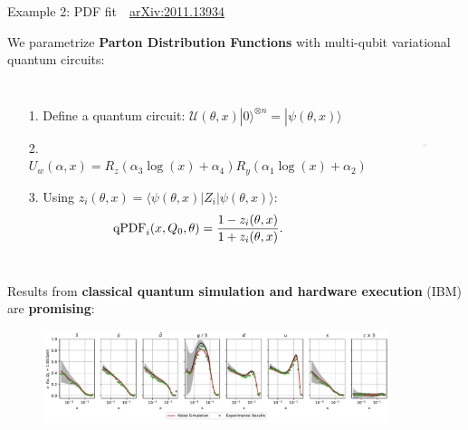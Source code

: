\documentclass[aspectratio=169, 8pt, xcolor={svgnames}, hyperref={linkcolor=black}]{beamer}
\begin{document}
\begin{frame}[fragile]{Example 2: PDF fit \hfill \faBook\,\, \href{https://arxiv.org/abs/2011.13934}{arXiv:2011.13934}}

  \small
  We parametrize \textbf{Parton Distribution Functions} with multi-qubit variational quantum circuits:
  \begin{columns}
    \column{6cm}
    \begin{itemize}
      \item[1.] Define a quantum circuit: $\mathcal{U}(\theta, x) | 0 \rangle ^ {\otimes n} = | \psi (\theta, x) \rangle$
      \item[2.] $U_w (\alpha, x) = R_z(\alpha_3 \log(x) + \alpha_4) R_y(\alpha_1 \log(x) + \alpha_2)$
      \item[3.] Using $z_i (\theta, x) = \langle \psi (\theta, x) | Z_i | \psi (\theta, x) \rangle$:
      \begin{equation*}
        {\rm qPDF}_i (x, Q_0, \theta) = \frac{1-z_i (\theta, x)}{1+z_i(\theta, x)}.
      \end{equation*}
    \end{itemize}

    \column{4cm}
    \vspace{-0.2cm}
    \begin{figure}
      \includegraphics[height=3cm]{figures/layer.pdf}
    \end{figure}
  \end{columns}

  Results from \textbf{\color{teal} classical quantum simulation and hardware execution} (IBM) are \textbf{promising}:
  \begin{figure}
    \includegraphics[width=0.9\textwidth]{figures/Experiments-SingleFlavor.pdf}
  \end{figure}

\end{frame}
\end{document}
